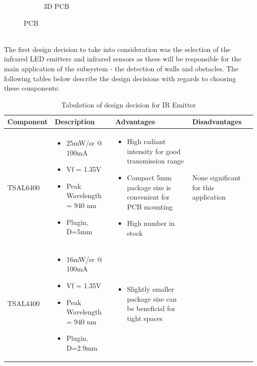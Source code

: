 \documentclass[class=report,11pt,crop=false]{standalone}
\begin{document}
\begin{figure}[htbp]
\begin{subfigure}[b]{0.6\linewidth}
        \caption{3D PCB}
        \label{fig:PCB_3D}
    \end{subfigure}
    \caption{PCB}
    \label{fig:PCB}
\end{figure}
\\
The first design decision to take into consideration was the selection of the infrared LED emitters and infrared sensors as these will be responsible for the main application of the subsystem - the detection of walls and obstacles. The following tables below describe the design decisions with regards to choosing these components:

\begin{table}[h]
  \begin{center}
    \caption{Tabulation of design decision for IR Emitter}
    \label{tab:IR emitters}
    \begin{tabular}{|>{\centering\arraybackslash}m{2cm}|m{3.5cm}|m{5cm}|m{6.5cm}|}
      \hline
      \textbf{Component} & \textbf{Description} & \textbf{Advantages} & \textbf{Disadvantages}\\   
      \hline
      TSAL6400 & 
      \begin{itemize}
      \item 25mW/sr @ 100mA 
      \item Vf = 1.35V 
      \item Peak Wavelength = 940 nm 
      \item Plugin, D=5mm 
      \end{itemize} &
      \begin{itemize}
      \item High radiant intensity for good transmission range 
      \item Compact 5mm package size is convenient for PCB mounting 
      \item High number in stock 
      \end{itemize} &
      None significant for this application \\
      \hline
      TSAL4400 & 
      \begin{itemize}
      \item 16mW/sr @ 100mA 
      \item Vf = 1.35V 
      \item Peak Wavelength = 940 nm 
      \item Plugin, D=2.9mm 
      \end{itemize} &
      \begin{itemize}
      \item Slightly smaller package size can be beneficial for tight spaces 

\end{itemize}
\end{tabular}
\end{center}
\end{table}
\end{document}
